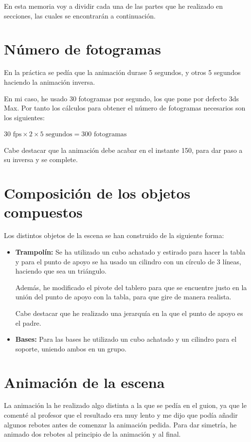 \documentclass{article}
\begin{document}
En esta memoria voy a dividir cada una de las partes que he realizado en secciones, las cuales se encontrarán a continuación.

\section{Número de fotogramas}

En la práctica se pedía que la animación durase 5 segundos, y otros 5 segundos haciendo la animación inversa. 

En mi caso, he usado 30 fotogramas por segundo, los que pone por defecto 3ds Max. Por tanto los cálculos para obtener el número de fotogramas necesarios son los siguientes:


$30 \text{ fps} \times 2 \times 5 \text{ segundos} = 300 \text{ fotogramas} $

Cabe destacar que la animación debe acabar en el instante 150, para dar paso a su inversa y se complete.

\section{Composición de los objetos compuestos}

Los distintos objetos de la escena se han construido de la siguiente forma:

\begin{itemize}
    \item \textbf{Trampolín: }Se ha utilizado un cubo achatado y estirado para hacer la tabla y para el punto de apoyo se ha usado un cilindro con un círculo de 3 líneas, haciendo que sea un triángulo.
    
    Además, he modificado el pivote del tablero para que se encuentre justo en la unión del punto de apoyo con la tabla, para que gire de manera realista.

    Cabe destacar que he realizado una jerarquía en la que el punto de apoyo es el padre.

    \item \textbf{Bases: }Para las bases he utilizado un cubo achatado y un cilindro para el soporte, uniendo ambos en un grupo.
\end{itemize}


\section{Animación de la escena}

La animación la he realizado algo distinta a la que se pedía en el guion, ya que le comenté al profesor que el resultado era muy lento y me dijo que podía añadir algunos rebotes antes de comenzar la animación pedida. Para dar simetría, he animado dos rebotes al principio de la animación y al final. 
\end{document}
